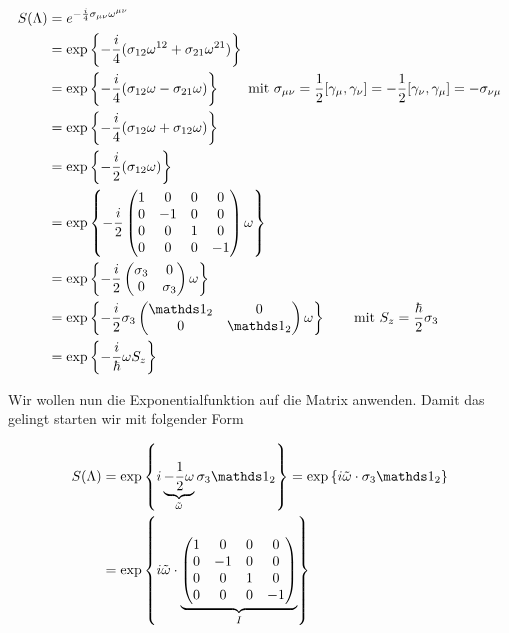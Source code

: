 \begin{align}
  \label{eq:39}
   S(\Lambda) &= e^{-\frac{i}{4}\sigma_{\mu\nu}\omega^{\mu\nu}} \notag \\
&= \exp\left\{-\frac{i}{4}(\sigma_{12}\omega^{12}+\sigma_{21}\omega^{21})\right\}\notag \\
&= \exp\left\{-\frac{i}{4}(\sigma_{12}\omega-\sigma_{21}\omega)\right\}\notag \qquad \text{mit } \sigma_{\mu\nu}=\frac{1}{2}[\gamma_\mu,\gamma_\nu]=- \frac{1}{2}[\gamma_\nu,\gamma_\mu] = -\sigma_{\nu\mu} \\
&= \exp\left\{-\frac{i}{4}(\sigma_{12}\omega+\sigma_{12}\omega)\right\}\notag \\
&= \exp\left\{-\frac{i}{2}(\sigma_{12}\omega)\right\}\notag \\
&= \exp\left\{-\frac{i}{2}  \begin{pmatrix}1&0&0&0\\ 0&-1&0&0\\0&0&1&0\\0&0&0&-1 \end{pmatrix}  \omega\right\}\notag \\
&= \exp\left\{-\frac{i}{2}  \begin{pmatrix}\sigma_3&0\\ 0&\sigma_3 \end{pmatrix}  \omega\right\}\notag \\
&= \exp\left\{-\frac{i}{2} \sigma_3 \begin{pmatrix}\mathds 1_2&0\\ 0&\mathds 1_2 \end{pmatrix}  \omega\right\}\qquad \text{mit }S_z = \frac{\hbar}{2}\sigma_3\notag \\
&= \exp\left\{-\frac{i}{\hbar}\omega S_z \right\}
\end{align}

Wir wollen nun die Exponentialfunktion auf die Matrix anwenden. Damit das gelingt starten wir mit folgender Form

\begin{align}
  \label{eq:40}
   S(\Lambda) &= \exp\left\{i\underbr{-\frac{1}{2}\omega}_{\tilde\omega}  \sigma_3 \mathds 1_2 \right\} = \exp\left\{i \tilde\omega \cdot \sigma_3\mathds 1_2 \right\} \\
 &=\exp\left\{i \tilde\omega \cdot \underbr{ \begin{pmatrix}1&0&0&0\\0&-1&0&0\\ 0&0&1&0\\0&0&0&-1 \end{pmatrix} }_{I} \right\} 
\end{align}

